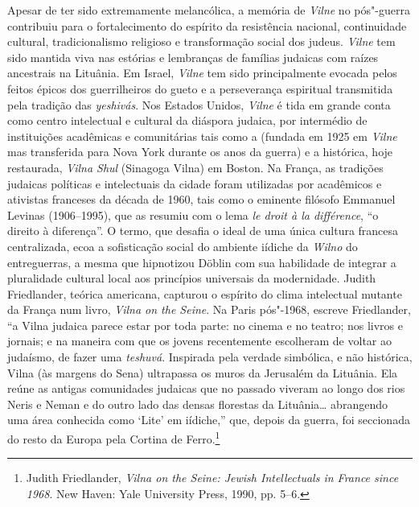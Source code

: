 Apesar de ter sido extremamente melancólica, a memória de \textit{Vilne} no
pós"-guerra contribuiu para o fortalecimento do espírito da resistência
nacional, continuidade cultural, tradicionalismo religioso e
transformação social dos judeus. \textit{Vilne} tem sido mantida viva nas
estórias e lembranças de famílias judaicas com raízes ancestrais na
Lituânia. Em Israel, \textit{Vilne} tem sido principalmente evocada pelos feitos
épicos dos guerrilheiros do gueto e a perseverança espiritual
transmitida pela tradição das \textit{yeshivás}. Nos Estados Unidos, \textit{Vilne} é tida
em grande conta como centro intelectual e cultural da diáspora judaica,
por intermédio de instituições acadêmicas e comunitárias tais como a
 (fundada em 1925 em \textit{Vilne} mas transferida para Nova York durante os
anos da guerra) e a histórica, hoje restaurada, \textit{Vilna Shul}
(Sinagoga Vilna) em Boston. Na França, as tradições judaicas políticas e
intelectuais da cidade foram utilizadas por acadêmicos e ativistas
franceses da década de 1960, tais como o eminente filósofo Emmanuel
Levinas (1906--1995), que as resumiu com o lema \textit{le droit à la
différence}, ``o direito à diferença''. O termo, que desafia o ideal de
uma única cultura francesa centralizada, ecoa a sofisticação social do
ambiente iídiche da \textit{Wilno} do entreguerras, a mesma que hipnotizou
Döblin com sua habilidade de integrar a pluralidade cultural local aos
princípios universais da modernidade. Judith Friedlander, teórica
americana, capturou o espírito do clima intelectual mutante da França
num livro, \textit{Vilna on the Seine}. Na Paris pós"-1968, escreve
Friedlander, ``a Vilna judaica parece estar por toda parte: no cinema e
no teatro; nos livros e jornais; e na maneira com que os jovens
recentemente escolheram de voltar ao judaísmo, de fazer uma \textit{teshuvá}.
Inspirada pela verdade simbólica, e não histórica, Vilna (às margens do
Sena) ultrapassa os muros da Jerusalém da Lituânia. Ela reúne as antigas
comunidades judaicas que no passado viveram ao longo dos rios Neris e
Neman e do outro lado das densas florestas da Lituânia\ldots{}
abrangendo uma área conhecida como `Lite' em iídiche,'' que, depois da
guerra, foi seccionada do resto da Europa pela Cortina de
Ferro.\footnote{Judith Friedlander, \textit{Vilna on the Seine: Jewish Intellectuals in France since 1968}. New Haven: Yale University Press, 1990, pp. 5--6.}

